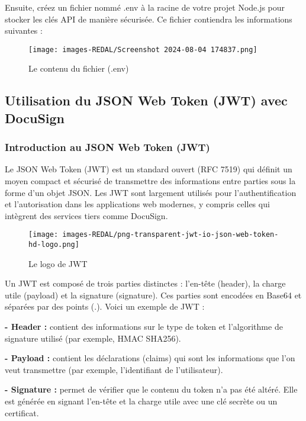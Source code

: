 Ensuite, créez un fichier nommé .env à la racine de votre projet Node.js pour stocker les clés API de manière sécurisée. Ce fichier contiendra les informations suivantes :

\begin{figure}[H]
\begin{center}
\texttt{[image: images-REDAL/Screenshot 2024-08-04 174837.png]}
\end{center}
\caption{Le contenu du fichier (.env) }
\end{figure}

\subsection{ Utilisation du JSON Web Token (JWT) avec DocuSign}

\subsubsection{Introduction au JSON Web Token (JWT)}
Le JSON Web Token (JWT) est un standard ouvert (RFC 7519) qui définit un moyen compact et sécurisé de transmettre des informations entre parties sous la forme d'un objet JSON. Les JWT sont largement utilisés pour l'authentification et l'autorisation dans les applications web modernes, y compris celles qui intègrent des services tiers comme DocuSign.


\begin{figure}[H]
\begin{center}
\texttt{[image: images-REDAL/png-transparent-jwt-io-json-web-token-hd-logo.png]}
\end{center}
\caption{Le logo de JWT   }
\end{figure}

Un JWT est composé de trois parties distinctes : l'en-tête (header), la charge utile (payload) et la signature (signature). Ces parties sont encodées en Base64 et séparées par des points (.). Voici un exemple de JWT :


\textbf{- Header : } contient des informations sur le type de token et l'algorithme de signature utilisé (par exemple, HMAC SHA256).

\textbf{- Payload : } contient les déclarations (claims) qui sont les informations que l'on veut transmettre (par exemple, l'identifiant de l'utilisateur).

\textbf{- Signature : } permet de vérifier que le contenu du token n'a pas été altéré. Elle est générée en signant l'en-tête et la charge utile avec une clé secrète ou un certificat.

